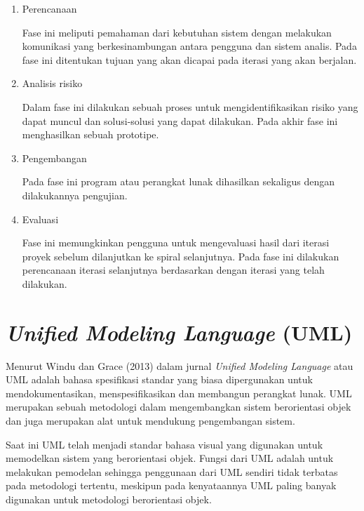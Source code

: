 \begin{enumerate}

	\item Perencanaan

	Fase ini meliputi pemahaman dari kebutuhan sistem dengan melakukan komunikasi yang berkesinambungan antara pengguna dan sistem analis. Pada fase ini ditentukan tujuan yang akan dicapai pada iterasi yang akan berjalan.

	\item Analisis risiko
	
	Dalam fase ini dilakukan sebuah proses untuk mengidentifikasikan risiko yang dapat muncul dan solusi-solusi yang dapat dilakukan. Pada akhir fase ini menghasilkan sebuah prototipe.

	\item Pengembangan

	Pada fase ini program atau perangkat lunak dihasilkan sekaligus dengan dilakukannya pengujian.

	\item Evaluasi

	Fase ini memungkinkan pengguna untuk mengevaluasi hasil dari iterasi proyek sebelum dilanjutkan ke spiral selanjutnya. Pada fase ini dilakukan perencanaan iterasi selanjutnya berdasarkan dengan iterasi yang telah dilakukan.

\end{enumerate}


\section{\textit{Unified Modeling Language} (UML)}
	Menurut Windu dan Grace (2013) dalam jurnal \cite{Suendri2018} \textit{Unified Modeling Language} atau UML adalah bahasa spesifikasi standar yang biasa dipergunakan untuk mendokumentasikan, menspesifikasikan dan membangun perangkat lunak. UML merupakan sebuah metodologi dalam mengembangkan sistem berorientasi objek dan juga merupakan alat untuk mendukung pengembangan sistem.

	Saat ini UML telah menjadi standar bahasa visual yang digunakan untuk memodelkan sistem yang berorientasi objek. Fungsi dari UML adalah untuk melakukan pemodelan sehingga penggunaan dari UML sendiri tidak terbatas pada metodologi tertentu, meskipun pada kenyataannya UML paling banyak digunakan untuk metodologi berorientasi objek.

